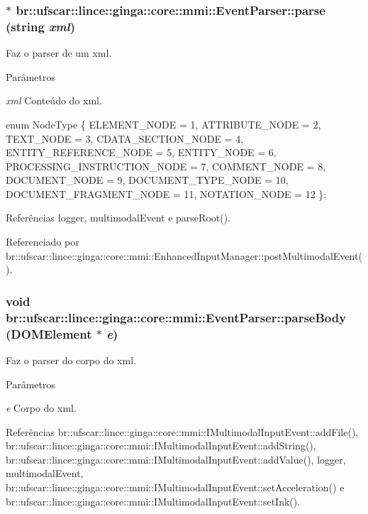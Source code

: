 \subsubsection[{parse}]{ $\ast$ br::ufscar::lince::ginga::core::mmi::EventParser::parse (string {\em xml})\hspace{0.3cm}{\ttfamily  [virtual]}}\label{classbr_1_1ufscar_1_1lince_1_1ginga_1_1core_1_1mmi_1_1EventParser_a7eb3dadffbdd500f63c73cdb62c5435a}
Faz o parser de um xml. 
\begin{DoxyParams}{Parâmetros}
\item[{\em xml}]Conteúdo do xml.\end{DoxyParams}
enum NodeType \{ ELEMENT\_\-NODE = 1, ATTRIBUTE\_\-NODE = 2, TEXT\_\-NODE = 3, CDATA\_\-SECTION\_\-NODE = 4, ENTITY\_\-REFERENCE\_\-NODE = 5, ENTITY\_\-NODE = 6, PROCESSING\_\-INSTRUCTION\_\-NODE = 7, COMMENT\_\-NODE = 8, DOCUMENT\_\-NODE = 9, DOCUMENT\_\-TYPE\_\-NODE = 10, DOCUMENT\_\-FRAGMENT\_\-NODE = 11, NOTATION\_\-NODE = 12 \}; 

Referências logger, multimodalEvent e parseRoot().



Referenciado por br::ufscar::lince::ginga::core::mmi::EnhancedInputManager::postMultimodalEvent().

\subsubsection[{parseBody}]{\setlength{\rightskip}{0pt plus 5cm}void br::ufscar::lince::ginga::core::mmi::EventParser::parseBody (DOMElement $\ast$ {\em e})\hspace{0.3cm}{\ttfamily  [virtual]}}\label{classbr_1_1ufscar_1_1lince_1_1ginga_1_1core_1_1mmi_1_1EventParser_afd2f2aa77bb6eb0ef26bf3db3d7c1d0c}
Faz o parser do corpo do xml. 
\begin{DoxyParams}{Parâmetros}
\item[{\em e}]Corpo do xml. \end{DoxyParams}


Referências br::ufscar::lince::ginga::core::mmi::IMultimodalInputEvent::addFile(), br::ufscar::lince::ginga::core::mmi::IMultimodalInputEvent::addString(), br::ufscar::lince::ginga::core::mmi::IMultimodalInputEvent::addValue(), logger, multimodalEvent, br::ufscar::lince::ginga::core::mmi::IMultimodalInputEvent::setAcceleration() e br::ufscar::lince::ginga::core::mmi::IMultimodalInputEvent::setInk().



